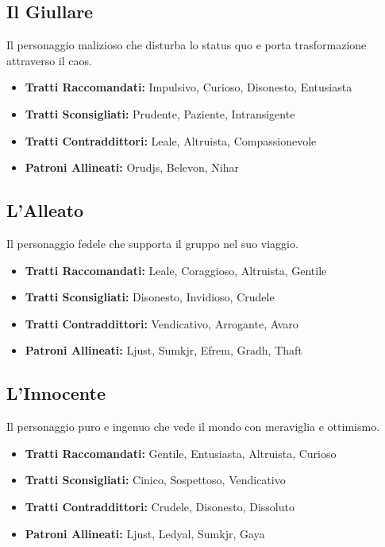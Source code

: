 \begin{multicols}{2}
\subsection*{Il Giullare}
Il personaggio malizioso che disturba lo status quo e porta trasformazione attraverso il caos.

\noindent\begin{itemize}[leftmargin=*] \setlength{\itemsep}{0pt}
\item \textbf{Tratti Raccomandati:} Impulsivo, Curioso, Disonesto, Entusiasta
\item \textbf{Tratti Sconsigliati:} Prudente, Paziente, Intransigente
\item \textbf{Tratti Contraddittori:} Leale, Altruista, Compassionevole
\item \textbf{Patroni Allineati:} Orudjs, Belevon, Nihar
\end{itemize}

\subsection*{L'Alleato}
Il personaggio fedele che supporta il gruppo nel suo viaggio.

\noindent\begin{itemize}[leftmargin=*] \setlength{\itemsep}{0pt}
\item \textbf{Tratti Raccomandati:} Leale, Coraggioso, Altruista, Gentile
\item \textbf{Tratti Sconsigliati:} Disonesto, Invidioso, Crudele
\item \textbf{Tratti Contraddittori:} Vendicativo, Arrogante, Avaro
\item \textbf{Patroni Allineati:} Ljust, Sumkjr, Efrem, Gradh, Thaft
\end{itemize}

\subsection*{L'Innocente}
Il personaggio puro e ingenuo che vede il mondo con meraviglia e ottimismo.

\noindent\begin{itemize}[leftmargin=*] \setlength{\itemsep}{0pt}
\item \textbf{Tratti Raccomandati:} Gentile, Entusiasta, Altruista, Curioso
\item \textbf{Tratti Sconsigliati:} Cinico, Sospettoso, Vendicativo
\item \textbf{Tratti Contraddittori:} Crudele, Disonesto, Dissoluto
\item \textbf{Patroni Allineati:} Ljust, Ledyal, Sumkjr, Gaya
\end{itemize}


\end{multicols}
